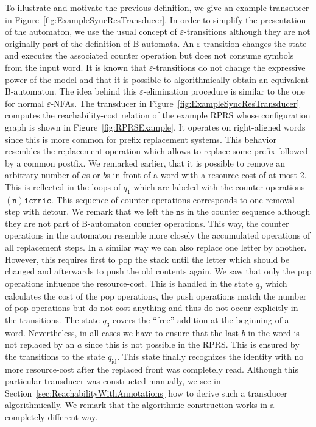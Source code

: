 \documentclass{LMCS}
\newcommand{\eps}{\varepsilon}
\newcommand{\rOp}{\ensuremath{\mathtt{r}}}
\newcommand{\nOp}{\ensuremath{\mathtt{n}}}
\newcommand{\icOp}{\ensuremath{\mathtt{i\! c}}}
\newcommand{\RPRS}{\textsf{RPRS}}
\begin{document}
To illustrate and motivate the previous definition, we give an example
transducer in Figure~\ref{fig:ExampleSyncResTransducer}. In order to simplify
the presentation of the automaton, we use the usual concept of $\eps$-transitions 
although they are not originally part of the definition 
of B-automata. An $\eps$-transition changes the state and executes the associated counter
operation but does not consume symbols from the input word. It is known that 
$\eps$-transitions do not change the expressive power of the model and that it
is possible to algorithmically obtain an equivalent B-automaton. The idea behind 
this $\eps$-elimination procedure is similar to the one for normal $\eps$-NFAs. The 
transducer in Figure~\ref{fig:ExampleSyncResTransducer} computes the 
reachability-cost relation of the example \RPRS{} 
whose configuration graph is shown in Figure~\ref{fig:RPRSExample}. It 
operates on right-aligned words since this is more common for prefix
replacement systems. This behavior resembles the replacement 
operation which allows to replace some prefix followed by a common postfix. 
We remarked earlier, that it is possible to remove an arbitrary number of 
$a$s or $b$s in front of a word with a resource-cost of at most 2. This is 
reflected in the loops of $q_1$ which are labeled with the counter operations 
$(\nOp)\icOp\rOp\nOp\icOp$. This sequence of counter operations corresponds 
to one removal step with detour. We remark that we left the $\nOp$s in the counter
sequence although they are not part of B-automaton counter operations. 
This way, the counter operations in the automaton  
resemble more closely the accumulated operations of all replacement steps. In a similar 
way we can also replace one letter by another. However, this requires first to 
pop the stack until the letter which should be changed and afterwards to push the old 
contents again. We saw that only the pop operations influence the 
resource-cost. This is handled in the state $q_2$ which calculates the cost of
the pop operations, the push operations match the number of pop operations but
do not cost anything and thus do not occur explicitly in the transitions.
The state $q_3$ covers the ``free'' addition at the 
beginning of a word. Nevertheless, in all cases we have to ensure that the 
last $b$ in the word is not replaced by an $a$ since this is not possible in 
the \RPRS{}. This is ensured by the transitions to the state 
$q_{\mathrm{id}}$. This state finally recognizes the identity with no more 
resource-cost after the replaced front was completely read. Although this 
particular transducer was constructed manually, we see in 
Section~\ref{sec:ReachabilityWithAnnotations} how to derive such a 
transducer algorithmically. We remark that the algorithmic construction
works in a completely different way. 
\end{document}
